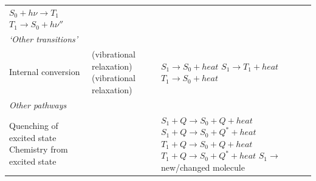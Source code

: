 \documentclass[
]{book}
\begin{document}
\begin{longtable}[]{@{}lll@{}}
\begin{minipage}[t]{0.26\columnwidth}
\(S_0 + h \nu \longrightarrow T_1\) \(T_1 \longrightarrow S_0 + h \nu ''\)\strut
\end{minipage}\tabularnewline
\begin{minipage}[t]{0.39\columnwidth}\raggedright
\emph{`Other transitions'}\strut
\end{minipage} & \begin{minipage}[t]{0.26\columnwidth}\raggedright
\strut
\end{minipage} & \begin{minipage}[t]{0.26\columnwidth}\raggedright
\strut
\end{minipage}\tabularnewline
\begin{minipage}[t]{0.39\columnwidth}\raggedright
Internal conversion \strut
\end{minipage} & \begin{minipage}[t]{0.26\columnwidth}\raggedright
(vibrational relaxation) (vibrational relaxation)\strut
\end{minipage} & \begin{minipage}[t]{0.26\columnwidth}\raggedright
\(S_1 \longrightarrow S_0 + heat\) \(S_1 \longrightarrow T_1 + heat\) \(T_1 \longrightarrow S_0 + heat\)\strut
\end{minipage}\tabularnewline
\begin{minipage}[t]{0.39\columnwidth}\raggedright
\emph{Other pathways}\strut
\end{minipage} & \begin{minipage}[t]{0.26\columnwidth}\raggedright
\strut
\end{minipage} & \begin{minipage}[t]{0.26\columnwidth}\raggedright
\strut
\end{minipage}\tabularnewline
\begin{minipage}[t]{0.39\columnwidth}\raggedright
Quenching of excited state Chemistry from excited state\strut
\end{minipage} & \begin{minipage}[t]{0.26\columnwidth}\raggedright
\strut
\end{minipage} & \begin{minipage}[t]{0.26\columnwidth}\raggedright
\(S_1 + Q \longrightarrow S_0 + Q +heat\) \(S_1 + Q \longrightarrow S_0 + Q^\ast +heat\) \(T_1 + Q \longrightarrow S_0 + Q +heat\) \(T_1 + Q \longrightarrow S_0 + Q^\ast +heat\) \(S_1 \longrightarrow\) new/changed molecule\strut
\end{minipage}\tabularnewline
\bottomrule
\end{longtable}
\end{document}
